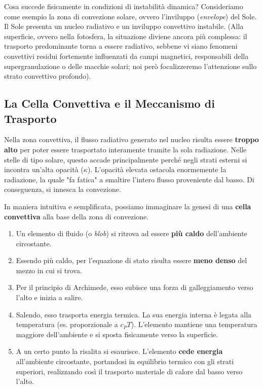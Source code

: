 Cosa succede fisicamente in condizioni di instabilità dinamica?
Consideriamo come esempio la zona di convezione solare, ovvero l'inviluppo (\textit{envelope}) del Sole. Il Sole presenta un nucleo radiativo e un inviluppo convettivo instabile. (Alla superficie, ovvero nella fotosfera, la situazione diviene ancora più complessa: il trasporto predominante torna a essere radiativo, sebbene vi siano fenomeni convettivi residui fortemente influenzati da campi magnetici, responsabili della supergranulazione o delle macchie solari; noi però focalizzeremo l'attenzione sullo strato convettivo profondo).

\subsection{La Cella Convettiva e il Meccanismo di Trasporto}

Nella zona convettiva, il flusso radiativo generato nel nucleo risulta essere \textbf{troppo alto} per poter essere trasportato interamente tramite la sola radiazione. Nelle stelle di tipo solare, questo accade principalmente perché negli strati esterni si incontra un'alta opacità ($\kappa$). L'opacità elevata ostacola enormemente la radiazione, la quale "fa fatica" a smaltire l'intero flusso proveniente dal basso. Di conseguenza, si innesca la convezione.

In maniera intuitiva e semplificata, possiamo immaginare la genesi di una \textbf{cella convettiva} alla base della zona di convezione.
\begin{enumerate}
\item Un elemento di fluido (o \textit{blob}) si ritrova ad essere \textbf{più caldo} dell'ambiente circostante.
\item Essendo più caldo, per l'equazione di stato risulta essere \textbf{meno denso} del mezzo in cui si trova.
\item Per il principio di Archimede, esso subisce una forza di galleggiamento verso l'alto e inizia a salire.
\item Salendo, esso trasporta energia termica. La sua energia interna è legata alla temperatura (es. proporzionale a $c_P T$). L'elemento mantiene una temperatura maggiore dell'ambiente e si sposta fisicamente verso la superficie.
\item A un certo punto la risalita si esaurisce. L'elemento \textbf{cede energia} all'ambiente circostante, portandosi in equilibrio termico con gli strati superiori, realizzando così il trasporto materiale di calore dal basso verso l'alto.
\end{enumerate}

